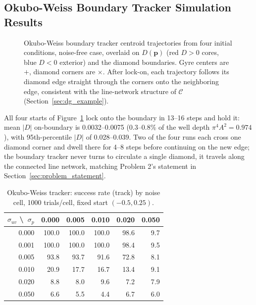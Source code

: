 \documentclass[12pt, letterpaper, oneside]{report}
\begin{document}
\subsection{Okubo-Weiss Boundary Tracker Simulation Results}

\begin{figure}[!t]
    \centering
    \framebox[0.9\linewidth]{\rule{0pt}{3.0cm}}
    \caption{Okubo-Weiss boundary tracker centroid trajectories from four
    initial conditions, noise-free case, overlaid on $D(\mathbf{p})$
    (red $D>0$ cores, blue $D<0$ exterior) and the diamond boundaries.
    Gyre centers are $+$, diamond corners are $\times$. After lock-on,
    each trajectory follows its diamond edge straight through the
    corners onto the neighboring edge, consistent with the line-network
    structure of $\mathcal{C}$ (Section~\ref{sec:dg_example}).}
    \label{fig:ow_trajectories}
\end{figure}

All four starts of Figure~\ref{fig:ow_trajectories} lock onto the
boundary in 13--16 steps and hold it: mean $|D|$ on-boundary is
0.0032--0.0075 (0.3--0.8\% of the well depth $\pi^4 A^2 = 0.974$), with
95th-percentile $|D|$ of 0.028--0.039. Two of the four runs each cross one
diamond corner and dwell there for 4--8 steps before continuing on the
new edge; the boundary tracker never turns to circulate a single
diamond, it travels along the connected line network, matching Problem
2's statement in Section~\ref{sec:problem_statement}.

\begin{table}[!t]
\centering
\caption{Okubo-Weiss tracker: success rate (track) by noise cell, 1000
trials/cell, fixed start $(-0.5, 0.25)$.}
\label{tab:ow_success}
\footnotesize
\begin{tabular}{rrrrrr}
\toprule
$\sigma_{uv}$ \textbackslash\ $\sigma_p$ & 0.000 & 0.005 & 0.010 & 0.020 & 0.050 \\
\midrule
0.000 & 100.0 & 100.0 & 100.0 &  98.6 &   9.7 \\
0.001 & 100.0 & 100.0 & 100.0 &  98.4 &   9.5 \\
0.005 &  93.8 &  93.7 &  91.6 &  72.8 &   8.1 \\
0.010 &  20.9 &  17.7 &  16.7 &  13.4 &   9.1 \\
0.020 &   8.8 &   8.0 &   9.6 &   7.2 &   7.9 \\
0.050 &   6.6 &   5.5 &   4.4 &   6.7 &   6.0 \\
\bottomrule
\end{tabular}
\end{table}
\end{document}
